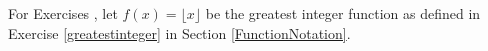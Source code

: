 {\noindent For Exercises}
{, let  $f(x) = \lfloor x \rfloor$ be the greatest integer function as defined in Exercise \ref{greatestinteger} in Section \ref{FunctionNotation}. }
